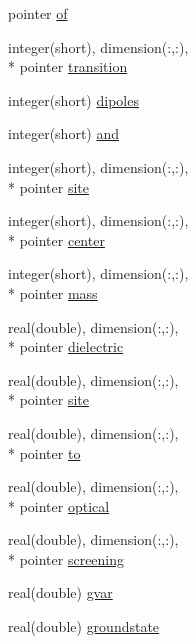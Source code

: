 \begin{DoxyCompactItemize}
pointer \hyperlink{structdipoles__class_1_1dipoles_ae6c47d2cab7825bb83f85b624a3acb17}{of}
\item 
integer(short), dimension(\-:,\-:), \\*
pointer \hyperlink{structdipoles__class_1_1dipoles_a0b9e590823522c87bb16a014777bc66e}{transition}
\item 
integer(short) \hyperlink{structdipoles__class_1_1dipoles_a2e2a7912feab61f030584442c17fd64b}{dipoles}
\item 
integer(short) \hyperlink{structdipoles__class_1_1dipoles_a7009b45719053d38b8b082f1505127cd}{and}
\item 
integer(short), dimension(\-:,\-:), \\*
pointer \hyperlink{structdipoles__class_1_1dipoles_ae35c528d0361b9cd3c1825567339acff}{site}
\item 
integer(short), dimension(\-:,\-:), \\*
pointer \hyperlink{structdipoles__class_1_1dipoles_a959e48d8726c84ad96695f27f5a324df}{center}
\item 
integer(short), dimension(\-:,\-:), \\*
pointer \hyperlink{structdipoles__class_1_1dipoles_a30387a2e38cdc8fac3440fb019fa39e4}{mass}
\item 
real(double), dimension(\-:,\-:), \\*
pointer \hyperlink{structdipoles__class_1_1dipoles_a669f75c4c95efa1ea721ba8aa7f785d3}{dielectric}
\item 
real(double), dimension(\-:,\-:), \\*
pointer \hyperlink{structdipoles__class_1_1dipoles_a195b04ed4976581c965eb24b155dee4b}{site}
\item 
real(double), dimension(\-:,\-:), \\*
pointer \hyperlink{structdipoles__class_1_1dipoles_aa236248648a049967f193ec7a2e721a3}{to}
\item 
real(double), dimension(\-:,\-:), \\*
pointer \hyperlink{structdipoles__class_1_1dipoles_a7a0b0cffbbb4e48c4bced86e3684ac14}{optical}
\item 
real(double), dimension(\-:,\-:), \\*
pointer \hyperlink{structdipoles__class_1_1dipoles_a353f22dda5068231a14e388b11f2c5cc}{screening}
\item 
real(double) \hyperlink{structdipoles__class_1_1dipoles_a6723a79a10a1b02fe363c2fdf8d0b1aa}{gvar}
\item 
real(double) \hyperlink{structdipoles__class_1_1dipoles_a0ad3fc4bf8e3d48aea2e39d709e5f4ca}{groundstate}

\end{DoxyCompactItemize}
